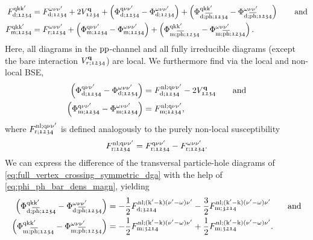 \documentclass[\main/main.tex]{subfiles}
\begin{document}
\begin{align}\label{eq:full_vertex_crossing_symmetric_dga}
	F^{\text{q}\text{k}\text{k}'}_{\text{d};\mathfrak{1234}}&=F^{\omega\nu\nu'}_{\text{d};\mathfrak{1234}}+2 V_{\mathfrak{1234}}^{\textbf{q}}+\left (\Phi^{\text{q}\nu\nu'}_{\text{d};\mathfrak{1234}}-\Phi^{\omega\nu\nu'}_{\text{d};\mathfrak{1234}}\right )+\left (\Phi^{\text{q}\text{k}\text{k}'}_{\text{d};\overline{\text{ph}};\mathfrak{1234}}-\Phi^{\omega\nu\nu'}_{\text{d};\overline{\text{ph}};\mathfrak{1234}}\right )\qquad\text{and}\\
	F^{\text{q}\text{k}\text{k}'}_{\text{m};\mathfrak{1234}}&=F^{\omega\nu\nu'}_{\text{r};\mathfrak{1234}}+\left (\Phi^{\text{q}\nu\nu'}_{\text{m};\mathfrak{1234}}-\Phi^{\omega\nu\nu'}_{\text{m};\mathfrak{1234}}\right )+\left (\Phi^{\text{q}\text{k}\text{k}'}_{\text{m};\overline{\text{ph}};\mathfrak{1234}}-\Phi^{\omega\nu\nu'}_{\text{m};\overline{\text{ph}};\mathfrak{1234}}\right ).
\end{align}
Here, all diagrams in the $\text{pp}$-channel and all fully irreducible diagrams (except the bare interaction $V^{\textbf{q}}_{r;\mathfrak{1234}}$) are local. We furthermore find via the local and non-local BSE,
\begin{subequations}
\begin{align}
	\left (\Phi^{\text{q}\nu\nu'}_{\text{d};\mathfrak{1234}}-\Phi^{\omega\nu\nu'}_{\text{d};\mathfrak{1234}}\right )&=F_{\text{d};\mathfrak{1234}}^{\text{nl};\text{q}\nu\nu'}-2 V^{\textbf{q}}_{\mathfrak{1234}}\qquad\text{and}\\
	\left (\Phi^{\text{q}\nu\nu'}_{\text{m};\mathfrak{1234}}-\Phi^{\omega\nu\nu'}_{\text{m};\mathfrak{1234}}\right )&=F_{\text{m};\mathfrak{1234}}^{\text{nl};\text{q}\nu\nu'},
\end{align}
\end{subequations}
where $F_{\text{r};\mathfrak{1234}}^{\text{nl};\text{q}\nu\nu'}$ is defined analogously to the purely non-local susceptibility 
\begin{align}
	F_{\text{r};\mathfrak{1234}}^{\text{nl};\text{q}\nu\nu'}=F_{\text{r};\mathfrak{1234}}^{\text{q}\nu\nu'}-F_{\text{r};\mathfrak{1234}}^{\omega\nu\nu'}.
\end{align}
We can express the difference of the transversal particle-hole diagrams of \eqref{eq:full_vertex_crossing_symmetric_dga} with the help of  \eqref{eq:phi_ph_bar_dens_magn}, yielding
\begin{subequations}
\begin{align}
	\left (\Phi^{\text{q}\text{k}\text{k}'}_{\text{d};\overline{\text{ph}};\mathfrak{1234}}-\Phi^{\omega\nu\nu'}_{\text{d};\overline{\text{ph}};\mathfrak{1234}}\right )&=-\frac12 F_{\text{d};\mathfrak{3214}}^{\text{nl};(\text{k}'-\text{k})(\nu'-\omega)\nu'}-\frac32 F_{\text{m};\mathfrak{3214}}^{\text{nl};(\text{k}'-\text{k})(\nu'-\omega)\nu'}\qquad\text{and}\\
	\left (\Phi^{\text{q}\text{k}\text{k}'}_{\text{m};\overline{\text{ph}};\mathfrak{1234}}-\Phi^{\omega\nu\nu'}_{\text{m};\overline{\text{ph}};\mathfrak{1234}}\right )&=-\frac12 F_{\text{m};\mathfrak{3214}}^{\text{nl};(\text{k}'-\text{k})(\nu'-\omega)\nu'}+\frac12 F_{\text{m};\mathfrak{3214}}^{\text{nl};(\text{k}'-\text{k})(\nu'-\omega)\nu'}.
\end{align}
\end{subequations}
\end{document}
